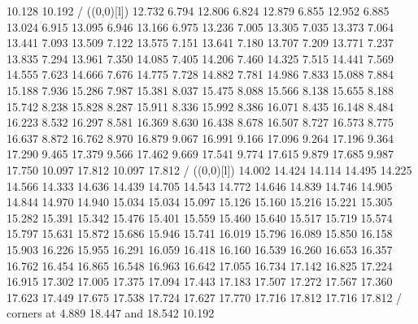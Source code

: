 {        10.128 10.192
        /
\linethickness=2pt
\setplotsymbol ({\makebox(0,0)[l]{\tencirc{}}})
%
%
 12.732      6.794 12.806
         6.824 12.879
         6.855 12.952
         6.885 13.024
         6.915 13.095
         6.946 13.166
         6.975 13.236
         7.005 13.305
         7.035 13.373
         7.064 13.441
         7.093 13.509
         7.122 13.575
         7.151 13.641
         7.180 13.707
         7.209 13.771
         7.237 13.835
         7.294 13.961
         7.350 14.085
         7.405 14.206
         7.460 14.325
         7.515 14.441
         7.569 14.555
         7.623 14.666
         7.676 14.775
         7.728 14.882
         7.781 14.986
         7.833 15.088
         7.884 15.188
         7.936 15.286
         7.987 15.381
         8.037 15.475
         8.088 15.566
         8.138 15.655
         8.188 15.742
         8.238 15.828
         8.287 15.911
         8.336 15.992
         8.386 16.071
         8.435 16.148
         8.484 16.223
         8.532 16.297
         8.581 16.369
         8.630 16.438
         8.678 16.507
         8.727 16.573
         8.775 16.637
         8.872 16.762
         8.970 16.879
         9.067 16.991
         9.166 17.096
         9.264 17.196
         9.364 17.290
         9.465 17.379
         9.566 17.462
         9.669 17.541
         9.774 17.615
         9.879 17.685
         9.987 17.750
        10.097 17.812
        10.097 17.812
        /
\linethickness=2pt
\setplotsymbol ({\makebox(0,0)[l]{\tencirc{}}})
%
%
 14.002     14.424 14.114
        14.495 14.225
        14.566 14.333
        14.636 14.439
        14.705 14.543
        14.772 14.646
        14.839 14.746
        14.905 14.844
        14.970 14.940
        15.034 15.034
        15.097 15.126
        15.160 15.216
        15.221 15.305
        15.282 15.391
        15.342 15.476
        15.401 15.559
        15.460 15.640
        15.517 15.719
        15.574 15.797
        15.631 15.872
        15.686 15.946
        15.741 16.019
        15.796 16.089
        15.850 16.158
        15.903 16.226
        15.955 16.291
        16.059 16.418
        16.160 16.539
        16.260 16.653
        16.357 16.762
        16.454 16.865
        16.548 16.963
        16.642 17.055
        16.734 17.142
        16.825 17.224
        16.915 17.302
        17.005 17.375
        17.094 17.443
        17.183 17.507
        17.272 17.567
        17.360 17.623
        17.449 17.675
        17.538 17.724
        17.627 17.770
        17.716 17.812
        17.716 17.812
        /
\linethickness=0pt
\putrectangle corners at  4.889 18.447 and 18.542 10.192
\endpicture}
